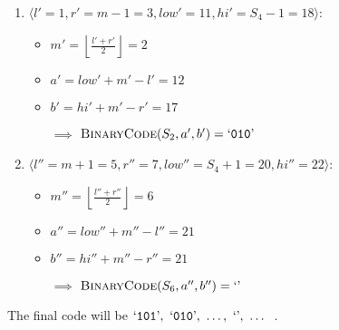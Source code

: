 \begin{enumerate}
\begin{enumerate}
    \item $\langle l' = 1, r' = m - 1 = 3, low' = 11, hi' = S_4 - 1 = 18
    \rangle$:
    \begin{itemize}
      \item $m' = \left\lfloor \frac{l' + r'}{2} \right\rfloor = 2$
      \item $a' = low' + m' - l' = 12$
      \item $b' = hi' + m' - r' = 17$
      \item[$\implies$] $\text{\sc BinaryCode}(S_2, a', b') =
      \text{`{\tt 010}'}$
    \end{itemize}

    \item $\langle l'' = m + 1 = 5, r'' = 7, low'' = S_4 + 1 = 20, hi'' = 22
    \rangle$:
    \begin{itemize}
      \item $m'' = \left\lfloor \frac{l'' + r''}{2} \right\rfloor = 6$
      \item $a'' = low'' + m'' - l'' = 21$
      \item $b'' = hi'' + m'' - r'' = 21$
      \item[$\implies$] $\text{\sc BinaryCode}(S_6, a'', b'') = \text{`'}$
    \end{itemize}

  \end{enumerate}
  The final code will be $\text{`{\tt 101}'},\ \text{`{\tt 010}'},\ \dots, \
  \text{`'},\ \dots$\ .

\end{enumerate}
